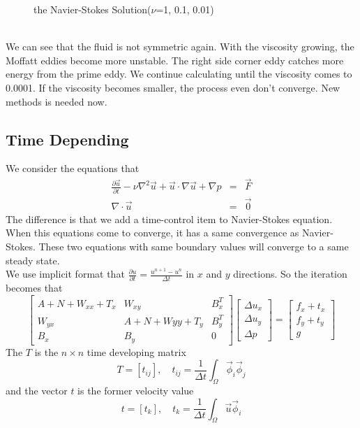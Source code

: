 \documentclass[a4paper]{article}
\begin{document}
\begin{figure}[h]
\caption{the Navier-Stokes Solution($\nu$=1, 0.1, 0.01)}
\label{im::Navier-Stoke-solution}
\end{figure}
\\
We can see that the fluid is not symmetric again. With the viscosity growing, the Moffatt eddies become more unstable. The right side corner eddy catches more energy from the prime eddy. We continue calculating until the viscosity comes to 0.0001. If the viscosity becomes smaller, the process even don't converge. New methods is needed now.
\subsection{Time Depending}
We consider the equations that
\begin{equation}
\begin{array}{rcl}
\frac{\partial\vec{u}}{\partial t}-\nu \nabla^2 \vec{u} + \vec{u}\cdot \nabla \vec{u} + \nabla p &=& \vec{F} \\
\nabla \cdot \vec{u} &=& \vec{0}
\label{eq::Timedepending-problem}
\end{array}
\end{equation}
The difference is that we add a time-control item to Navier-Stokes equation. When this equations come to converge, it has a same convergence as Navier-Stokes. These two equations with same boundary values will converge to a same steady state.\\
We use implicit format that $\frac{\partial u}{\partial t} = \frac{u^{n+1}-u^{n}}{\Delta t}$ in $x$ and $y$ directions.
So the iteration becomes that
\begin{equation}
\left[ \begin{array}{ccc}
A + N +W_{xx} + T_x & W_{xy} & B_x^T \\
W_{yx} & A +N +W{yy} + T_y& B_y^T \\
B_x & B_y & 0
\end{array}
\right]
\left[\begin{array}{ccc}
\Delta u_x\\
\Delta u_y\\
\Delta p
\end{array}
\right]=
\left[\begin{array}{ccc}
f_x + t_x\\
f_y + t_y\\
g
\end{array}
\right]
\label{Timedepending}
\end{equation}
The $T$ is the $n\times n$ time developing matrix
\begin{equation}
T = [t_{ij}],\quad t_{ij}=\frac{1}{\Delta t}\int_{\Omega}\vec{\phi}_i\vec{\phi}_j
\end{equation}
and the vector $t$ is the former velocity value
\begin{equation}
t = [t_{k}],\quad t_{k}=\frac{1}{\Delta t}\int_{\Omega}\vec{u}\vec{\phi}_i
\end{equation}
\end{document}

